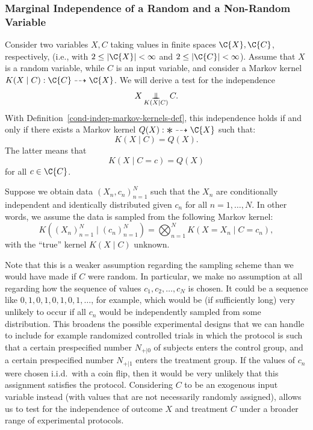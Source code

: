 \subsubsection{Marginal Independence of a Random and a Non-Random Variable}

Consider two variables $X,C$ taking values in finite spaces $\C{X},\C{C}$, respectively,
(i.e., with $2\le|\C{X}|<\infty$ and $2\le|\C{C}|<\infty$).
Assume that $X$ is a random variable, while $C$ is an input variable, 
and consider a Markov kernel $K(X\mid C) : \C{C} \dshto \C{X}$. 
We will derive a test for the independence $$X \operatorname*{\perp\mkern-11mu\perp}_{K(X\mid C)} C.$$
With Definition~\ref{cond-indep-markov-kernels-def}, this independence holds
if and only if there exists a Markov kernel $Q(X) : \Asterisk \dshto \C{X}$ such that:
\[ K(X\mid C) = Q(X).\]
The latter means that
\begin{equation}\label{eq:indep_test_CX}
  K(X \mid C=c) = Q(X)
\end{equation}
for all $c \in \C{C}$.

Suppose we obtain data $(X_n,c_n)_{n=1}^N$ such that the
$X_n$ are conditionally independent and identically distributed given $c_n$ for all $n=1,\dots,N$.
In other words, we assume the data is sampled from the following Markov kernel:
$$K((X_n)_{n=1}^N \mid (c_n)_{n=1}^N) = \bigotimes_{n=1}^N K(X=X_n \mid C=c_n),$$
with the ``true'' kernel $K(X \mid C)$ unknown.

Note that this is a weaker assumption regarding the sampling scheme than
we would have made if $C$ were random. In particular, we make no assumption
at all regarding how the sequence of values $c_1,c_2,\dots,c_N$ is chosen.
It could be a sequence like $0,1,0,1,0,1,0,1,\dots$, for example, which would
be (if sufficiently long) very unlikely to occur if all $c_n$ would be independently
sampled from some distribution. This broadens the possible experimental designs that
we can handle to include for example randomized controlled trials in which the 
protocol is such that a certain prespecified number $N_{+|0}$ of subjects enters the control
group, and a certain prespecified number $N_{+|1}$ enters the treatment group. If the values
of $c_n$ were chosen i.i.d.\ with a coin flip, then it would be very unlikely that
this assignment satisfies the protocol. Considering $C$ to be an exogenous input
variable instead (with values that are not necessarily randomly assigned), allows us to test for the 
independence of outcome $X$ and treatment $C$ under a broader range of experimental
protocols.

